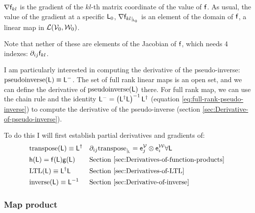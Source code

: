 ${\mathbf \nabla}{\mathsf{f}_{kl}}$ is the gradient of the $kl$-th matrix coordinate of the value of $\mathsf{f}$.
As usual, the value of the gradient at a specific $\mathsf{L}_0$,
${\mathbf \nabla}{\mathsf{f}_{kl}}_{\mid_{\mathsf{L}_0}}$ is an element of the domain of $\mathsf{f}$,
a linear map in $\mathcal{L}(\mathcal{V}_0,\mathcal{W}_0)$.

Note that nether of these are elements of the Jacobian of $\mathsf{f}$,
which needs 4 indexes: ${\partial}_{ij}{\mathsf{f}_{kl}}$.

I am particularly interested in computing the derivative of the
pseudo-inverse: $\mathrm{pseudoinverse}(\mathsf{L}) \equiv \mathsf{L}^{-}$.
The set of full rank linear maps is an open set,
and we can define the derivative of $\mathrm{pseudoinverse}(\mathsf{L})$ there.
For full rank map,
we can use the chain rule and the identity
$\mathsf{L}^{-} = \left( \mathsf{L}^{\dagger} \mathsf{L} \right)^{-1} \mathsf{L}^{\dagger}$
(equation \ref{eq:full-rank-pseudo-inverse})
to compute the derivative of the pseudo-inverse
(section \ref{sec:Derivative-of-pseudo-inverse}).

To do this I will first establish partial derivatives and gradients of:
\begin{equation}
\begin{aligned}
\label{eq:transpose-derivative}
&\mathrm{transpose}(\mathsf{L}) \equiv \mathsf{L}^{\dagger}
&&{\partial}_{ij}{\mathrm{transpose}}_{\mid_{\mathsf{L}}} =  \mathsf{e}_j^{\mathcal{V}} \otimes \mathsf{e}_i^{\mathcal{W}}
\forall \mathsf{L}
\\
&\mathsf{h}( \mathsf{L} ) = \mathsf{f} ( \mathsf{L} ) \mathsf{g} ( \mathsf{L} )
&&\text{Section \ref{sec:Derivatives-of-function-products} }
\\
&\mathrm{LTL}(\mathsf{L}) \equiv \mathsf{L}^{\dagger} \mathsf{L}
&&\text{Section \ref{sec:Derivatives-of-LTL} }
\\
&\mathrm{inverse}(\mathsf{L}) \equiv \mathsf{L}^{-1}
&&\text{Section \ref{sec:Derivative-of-inverse} }
\end{aligned}
\end{equation}


\subsubsection{Map product}
\label{sec:Derivatives-of-function-products}

